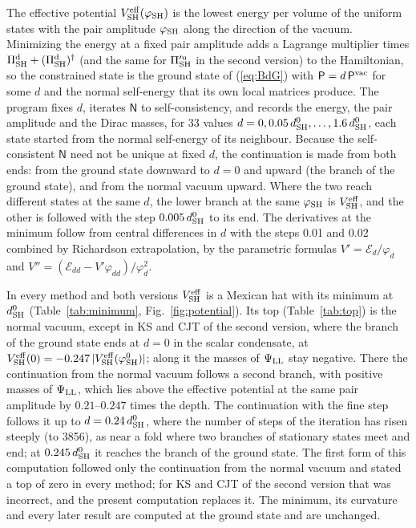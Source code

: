 \documentclass[aps,prd,onecolumn,superscriptaddress,nofootinbib,floatfix,longbibliography]{revtex4-2}
\newcommand{\LL}{{\rm LL}}
\newcommand{\SH}{{\rm SH}}
\begin{document}
The effective potential $V^{\rm eff}_\SH(\varphi_\SH)$ is the lowest energy per volume of the uniform states with the pair
amplitude $\varphi_\SH$ along the direction of the vacuum. Minimizing the energy at a fixed pair amplitude adds a Lagrange
multiplier times $\Pi^{\rm d}_\SH+(\Pi^{\rm d}_\SH)^\dagger$ (and the same for $\Pi'^{\rm u}_\SH$ in the second version) to the
Hamiltonian, so the constrained state is the ground state of (\ref{eq:BdG}) with $\mathsf P=d\,\mathsf P^{\rm vac}$ for some
$d$ and the normal self-energy that its own local matrices produce. The program fixes $d$, iterates $\mathsf N$ to
self-consistency, and records the energy, the pair amplitude and the Dirac masses, for 33 values
$d=0,0.05\,d^0_\SH,\dots,1.6\,d^0_\SH$, each state started from the normal self-energy of its neighbour. Because the
self-consistent $\mathsf N$ need not be unique at fixed $d$, the continuation is made from both ends: from the ground state
downward to $d=0$ and upward (the branch of the ground state), and from the normal vacuum upward. Where the two reach
different states at the same $d$, the lower branch at the same $\varphi_\SH$ is $V^{\rm eff}_\SH$, and the other is followed
with the step $0.005\,d^0_\SH$ to its end. The derivatives at the minimum follow from central differences in $d$ with the
steps 0.01 and 0.02 combined by Richardson extrapolation, by the parametric formulas
$V'=\mathcal E_d/\varphi_d$ and $V''=(\mathcal E_{dd}-V'\varphi_{dd})/\varphi_d^2$.

In every method and both versions $V^{\rm eff}_\SH$ is a Mexican hat with its minimum at $d^0_\SH$ (Table~\ref{tab:minimum},
Fig.~\ref{fig:potential}). Its top (Table~\ref{tab:top}) is the normal vacuum, except in KS and CJT of the second version,
where the branch of the ground state ends at $d=0$ in the scalar condensate, at
$V^{\rm eff}_\SH(0)=\ensuremath{-0.247}\,|V^{\rm eff}_\SH(\varphi^0_\SH)|$; along it the masses of $\Psi_\LL$ stay negative. There the
continuation from the normal vacuum follows a second branch, with positive masses of $\Psi_\LL$, which lies above the
effective potential at the same pair amplitude by \ensuremath{0.21}\mbox{--}\ensuremath{0.247} times the depth. The continuation with the fine step
follows it up to $d=0.24\,d^0_\SH$, where the number of steps of the iteration has risen steeply (to 3856),
as near a fold where two branches of stationary states meet and end; at $0.245\,d^0_\SH$ it reaches the branch of
the ground state. The first form of this computation followed only the continuation from the normal vacuum and stated a top
of zero in every method; for KS and CJT of the second version that was incorrect, and the present computation replaces
it. The minimum, its curvature and every later result are computed at the ground state and are unchanged.
\end{document}

